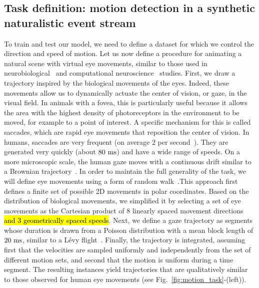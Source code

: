 \documentclass[default]{sn-jnl}%
\theoremstyle{thmstyleone}%
\theoremstyle{thmstyletwo}%
\theoremstyle{thmstylethree}%
\newcommand{\seeFig}[1]{see Fig.~\ref{fig:#1}}%
\newcommand{\note}[1]{{\sethlcolor{yellow}\hl{#1}}}
\begin{document}
\subsection{Task definition: motion detection in a synthetic naturalistic event stream}\label{sec:task}
To train and test our model, we need to define a dataset for which we control the direction and speed of motion. Let us now define a procedure for animating a natural scene with virtual eye movements, similar to those used in neurobiological~\citep{vinje_sparse_2000, baudot_animation_2013} and computational neuroscience~\citep{kremkow_push-pull_2016} studies. First, we draw a trajectory inspired by the biological movements of the eyes. Indeed, these movements allow us to dynamically actuate the center of vision, or gaze, in the visual field. In animals with a fovea, this is particularly useful because it allows the area with the highest density of photoreceptors in the environment to be moved, for example to a point of interest. A specific mechanism for this is called saccades, which are rapid eye movements that reposition the center of vision. In humans, saccades are very frequent (on average $2$ per second~\citep{dandekar_neural_2012}). They are generated very quickly (about $80~\si{\milli\second}$) and have a wide range of speeds. On a more microscopic scale, the human gaze moves with a continuous drift similar to a Brownian trajectory~\citep{poletti_head-eye_2015}. In order to maintain the full generality of the task, we will define eye movements using a form of random walk~\citep{engbert_integrated_2011}.This approach first defines a finite set of possible 2D movements in polar coordinates. Based on the distribution of biological movements, we simplified it by selecting a set of eye movements as the Cartesian product of $8$ linearly spaced movement directions \note{and 3 geometrically spaced speeds}. Next, we define a gaze trajectory as segments whose duration is drawn from a Poisson distribution with a mean block length of $20~\si{\milli\second}$, similar to a Lévy flight~\citep[p. 289]{mandelbrot_fractal_1982}. Finally, the trajectory is integrated, assuming first that the velocities are sampled uniformly and independently from the set of different motion sets, and second that the motion is uniform during a time segment. The resulting instances yield trajectories that are qualitatively similar to those observed for human eye movements (\seeFig{motion_task}-(left)).
\end{document}
